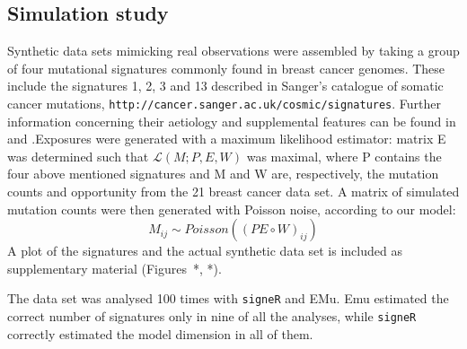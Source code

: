 \documentclass{bioinfo}
\begin{document}
\subsection{Simulation study}
Synthetic data sets mimicking real observations were assembled by
taking a group of four mutational signatures commonly found in 
breast cancer genomes. These include the signatures 1, 2, 3 and 13
described in Sanger's catalogue of somatic cancer mutations, 
\verb~http://cancer.sanger.ac.uk/cosmic/signatures~.
Further information concerning their aetiology and supplemental
features can be found in \cite{HEN} and
\cite{ANat}.Exposures were generated with a maximum likelihood 
estimator: matrix E was determined such that  $\mathcal L(M; P,E,W)$ 
was maximal, where P contains the four above mentioned signatures and 
M and W are, respectively, the mutation counts and opportunity from 
the 21 breast cancer data set. A matrix of simulated mutation counts 
were then generated with Poisson noise, according to our model:
\begin{equation}
  \label{eqn:simulation_matrix}
     M_{ij} \sim Poisson((PE\circ W)_{ij})
\end{equation}
A plot of the signatures and the actual synthetic data set is included
as supplementary material (Figures~*, *). 

The data set was analysed 100 times with \texttt{signeR} and EMu. Emu
estimated the correct number of signatures only in nine of all the
analyses, while \texttt{signeR} correctly estimated the model
dimension in all of them.
\end{document}

